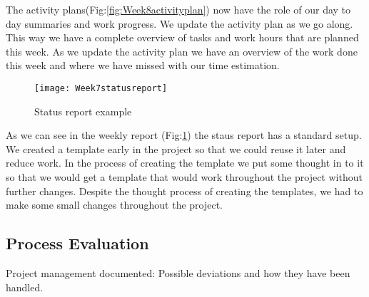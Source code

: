     The activity plans(Fig:\ref{fig:Week8activityplan}) now have the role of our day to day summaries and work progress. We update the activity plan as we go along. This way we have a complete overview of tasks and work hours that are planned this week. As we update the activity plan we have an overview of the work done this week and where we have missed with our time estimation. 
    
    \begin{figure}[h]
        \centering
        \texttt{[image: Week7statusreport]}
        \caption{Status report example}
        \label{fig:Week7statusreport}
    \end{figure}
    
    As we can see in the weekly report (Fig:\ref{fig:Week7statusreport}) the staus report has a standard setup. We created a template early in the project so that we could reuse it later and reduce work. In the process of creating the template we put some thought in to it so that we would get a template that would work throughout the project without further changes. Despite the thought process of creating the templates, we had to make some small changes throughout the project.
    
       \subsection{Process Evaluation}\label{Process Evaluation}
    
    Project management documented: 
    Possible deviations and how they have
been handled. 
